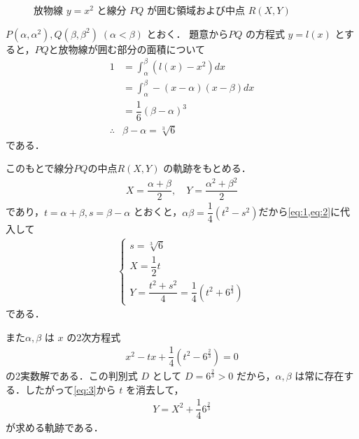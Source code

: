 \documentclass[../../main.tex]{subfiles}
\begin{document}
\begin{figure}[htb]
  \caption{放物線 $y = x^2$ と線分 $PQ$ が囲む領域および中点 $R(X, Y)$}
  \label{fig:parabola_chord_overview}
\end{figure}

$P(\alpha, \alpha^2), Q(\beta, \beta^2) \; (\alpha < \beta)$ とおく．
題意から$PQ$ の方程式 $y = l(x)$ とすると，$PQ$と放物線が囲む部分の面積について
\begin{align}
  1 &= \int_{\alpha}^{\beta} (l(x) - x^2) dx \\
  &= \int_{\alpha}^{\beta} -(x - \alpha)(x - \beta) dx \\
  &= \dfrac{1}{6} (\beta - \alpha)^3 \\
  \therefore
  & \beta - \alpha = \sqrt[3]{6} \label{eq:1}
\end{align}
である．

このもとで線分$PQ$の中点$R(X, Y)$ の軌跡をもとめる．
\begin{align}
  X = \dfrac{\alpha + \beta}{2} , \quad Y = \dfrac{\alpha^2 + \beta^2}{2} \label{eq:2}
\end{align}
であり，$t = \alpha + \beta, s = \beta - \alpha$ とおくと，$\alpha \beta = \dfrac{1}{4} (t^2 - s^2)$だから\cref{eq:1,eq:2}に代入して
\begin{align}
  \begin{cases}
    s = \sqrt[3]{6} \\
    X = \dfrac{1}{2} t \\
    Y = \dfrac{t^2 + s^2}{4} = \dfrac{1}{4} \left( t^2 + 6^{\frac{2}{3}} \right)
  \end{cases} \label{eq:3}
\end{align}
である．

また$\alpha, \beta$ は $x$ の2次方程式
\begin{align}
  x^2 - tx + \dfrac{1}{4}(t^2 - 6^{\frac{2}{3}}) = 0
\end{align}
の2実数解である．この判別式 $D$ として $D = 6^{\frac{2}{3}} > 0$ だから，$\alpha, \beta$ は常に存在する．したがって\cref{eq:3}から $t$ を消去して，
\begin{align}
  Y = X^2 + \dfrac{1}{4} 6^{\frac{2}{3}}
\end{align}
が求める軌跡である．
\end{document}
